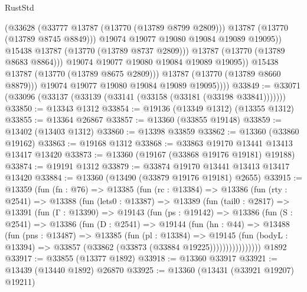 \begin{lexlean}{RustStd}
\begin{coremodule}
                            (@33628
                              (@33777 @13787 (@13770 (@13789 @8799 @2809)))
                              @13787
                              (@13770 (@13789 @8745 @8849)))
                            @19074
                            @19077
                            @19080
                            @19084
                            @19089
                            @19095))
                        @15438
                        @13787
                        (@13770 (@13789 @8737 @2809)))
                      @13787
                      (@13770 (@13789 @8683 @8864)))
                    @19074
                    @19077
                    @19080
                    @19084
                    @19089
                    @19095))
                @15438
                @13787
                (@13770 (@13789 @8675 @2809)))
              @13787
              (@13770 (@13789 @8660 @8879)))
            @19074
            @19077
            @19080
            @19084
            @19089
            @19095))))
@33849 := @33071 (@33096 (@33137 (@33139 (@33141 (@33158 (@33181 (@33198 @33841)))))))
@33850 := @13343 @1312
@33854 := @19136 (@13349 @1312) (@13355 @1312)
@33855 := @13364 @26867
@33857 := @13360 (@33855 @19148)
@33859 := @13402 (@13403 @1312)
@33860 := @13398 @33859
@33862 := @13360 (@33860 @19162)
@33863 := @19168 @1312
@33868 := @33863 @19170 @13441 @13413 @13417 @13420
@33873 := @13360 (@19167 (@33868 @19176 @19181) @19188)
@33874 := @19191 @1312
@33879 := @33874 @19170 @13441 @13413 @13417 @13420
@33884 := @13360 (@13490 (@33879 @19176 @19181) @2655)
@33915 := @13359
    (fun (fn : @76) =>
    @13385
      (fun (rc : @13384) =>
      @13386
        (fun (rty : @2541) =>
        @13388
          (fun (lets0 : @13387) =>
          @13389
            (fun (tail0 : @2817) =>
            @13391
              (fun (Γ : @13390) =>
              @19143
                (fun (ps : @19142) =>
                @13386
                  (fun (S : @2541) =>
                  @13386
                    (fun (D : @2541) =>
                    @19144
                      (fun (hn : @44) =>
                      @13488
                        (fun (pns : @13487) =>
                        @13385
                          (fun (pl : @13384) =>
                          @19145
                            (fun (bodyL : @13394) =>
                            @33857 (@33862 (@33873 (@33884 @19225))))))))))))))))
    @1892
@33917 := @33855 (@13377 @1892)
@33918 := @13360 @33917
@33921 := @13439 (@13440 @1892) @26870
@33925 := @13360 (@13431 (@33921 @19207) @19211)

\end{coremodule}
\end{lexlean}
